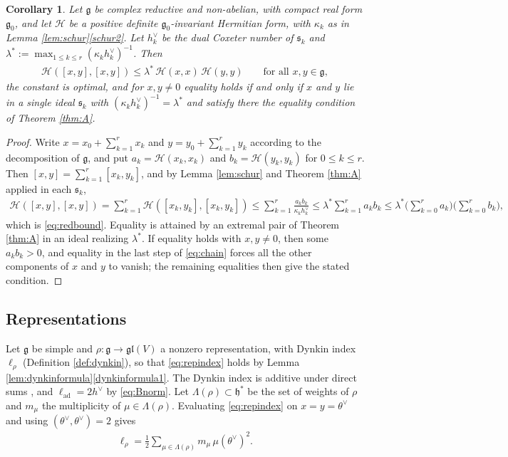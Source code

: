 \documentclass [leqno, 10pt]{amsart}
\newtheorem{corollary}[theorem]{Corollary}%
\theoremstyle{definition}
\numberwithin{equation}{section}
\newcommand{\h}{\mathfrak{h}}
\newcommand{\gl}{\mathfrak{gl}}
\newcommand{\g}{\mathfrak{g}}
\newcommand{\gz}{\g_{0}}
\newcommand{\hv}{h^\vee}
\newcommand{\HH}{\mathcal H}
\newcommand{\subs}{\mathfrak{s}}
\begin{document}
\begin{corollary}\label{thm:reductive}
Let $\g$ be complex reductive and non-abelian, with compact real form $\gz$, and let $\HH$ be a positive definite $\gz$-invariant Hermitian form, with $\kappa_{k}$ as in Lemma \ref{lem:schur}\ref{schur2}. Let $h_{k}^{\vee}$ be the dual Coxeter number of $\subs_{k}$ and $\lambda^{\ast} := \max_{1 \leq k \leq r}(\kappa_{k}h_{k}^{\vee})^{-1}$. Then
\begin{align}\label{eq:redbound}
\HH([x, y], [x, y]) \leq \lambda^{\ast}\,\HH(x, x)\,\HH(y, y) \qquad \text{for all } x, y \in \g,
\end{align}
the constant is optimal, and for $x, y \neq 0$ equality holds if and only if $x$ and $y$ lie in a single ideal $\subs_{k}$ with $(\kappa_{k}h_{k}^{\vee})^{-1} = \lambda^{\ast}$ and satisfy there the equality condition of Theorem \ref{thm:A}.
\end{corollary}
\begin{proof}
Write $x = x_{0} + \sum_{k=1}^{r}x_{k}$ and $y = y_{0} + \sum_{k=1}^{r}y_{k}$ according to the decomposition of $\g$, and put $a_{k} = \HH(x_{k}, x_{k})$ and $b_{k} = \HH(y_{k}, y_{k})$ for $0 \leq k \leq r$. Then $[x, y] = \sum_{k=1}^{r}[x_{k}, y_{k}]$, and by Lemma \ref{lem:schur} and Theorem \ref{thm:A} applied in each $\subs_{k}$,
\begin{align}\label{eq:chain}
\HH([x, y], [x, y]) = \sum_{k=1}^{r}\HH([x_{k}, y_{k}], [x_{k}, y_{k}]) \leq \sum_{k=1}^{r}\frac{a_{k}b_{k}}{\kappa_{k}h_{k}^{\vee}} \leq \lambda^{\ast}\sum_{k=1}^{r}a_{k}b_{k} \leq \lambda^{\ast}\Big(\sum_{k=0}^{r}a_{k}\Big)\Big(\sum_{k=0}^{r}b_{k}\Big),
\end{align}
which is \eqref{eq:redbound}. Equality is attained by an extremal pair of Theorem \ref{thm:A} in an ideal realizing $\lambda^{\ast}$. If equality holds with $x, y \neq 0$, then some $a_{k}b_{k} > 0$, and equality in the last step of \eqref{eq:chain} forces all the other components of $x$ and $y$ to vanish; the remaining equalities then give the stated condition.
\end{proof}

\subsection{Representations}
Let $\g$ be simple and $\rho: \g \to \gl(V)$ a nonzero representation, with Dynkin index $\ell_{\rho}$ (Definition \ref{def:dynkin}), so that \eqref{eq:repindex} holds by Lemma \ref{lem:dynkinformula}\ref{dynkinformula1}. The Dynkin index is additive under direct sums \cite[(2.24)]{Dynkin-semisimplesubalgebras}, and $\ell_{\mathrm{ad}} = 2\hv$ by \eqref{eq:Bnorm}. Let $\Lambda(\rho) \subset \h^{\ast}$ be the set of weights of $\rho$ and $m_{\mu}$ the multiplicity of $\mu \in \Lambda(\rho)$. Evaluating \eqref{eq:repindex} on $x = y = \theta^{\vee}$ and using $(\theta^{\vee}, \theta^{\vee}) = 2$ gives
\begin{align}\label{eq:indexweights}
\ell_{\rho} = \frac{1}{2}\sum_{\mu \in \Lambda(\rho)}m_{\mu}\,\mu(\theta^{\vee})^{2}.
\end{align}
\end{document}
